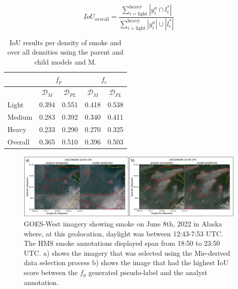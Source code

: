 \documentclass{article}
\begin{document}
\begin{equation} \label{overall_iou}
    IoU_{\text{overall}} = \frac{\sum\limits_{i=\text{light}}^{\text{heavy}}|y^a_{i}\cap l^*_{i}|  }{\sum\limits_{i=\text{light}}^{\text{heavy}}|y^a_{i}|\cup|l^*_{i}|}
\end{equation}

\begin{table} 
    \caption{IoU results per density of smoke and over all densities using the parent and child models and M.}\label{iou_results}
    \centering
    \begin{tabular}{lcc|cc}
        \toprule
        \multicolumn{1}{c}{} & \multicolumn{2}{c}{\(f_p\)} & \multicolumn{2}{c}{\(f_c\)}\\
        \midrule
        \multicolumn{1}{c}{} & \(\mathcal{D}_M\) & \(\mathcal{D}_{PL}\) & \(\mathcal{D}_M\) & \(\mathcal{D}_{PL}\) \\
        \midrule
        Light  & 0.394 &  0.551 & 0.418 &  0.538 \\
        Medium & 0.283 &  0.392 & 0.340 &  0.411 \\
        Heavy  & 0.233 &  0.290 & 0.270 &  0.325 \\
        Overall & 0.365 &  0.510 & 0.396 &  0.503 \\
        \bottomrule
    \end{tabular}
\end{table}

\begin{figure}
    \centering
    \includegraphics[width=14cm]{figures/D_m_vs_D_pl.png}
    \caption{GOES-West imagery showing smoke on June 8th, 2022 in Alaska where, at this geolocation, daylight was between 12:43-7:53 UTC. The HMS smoke annotations displayed span from 18:50 to 23:50 UTC. a) shows the imagery that was selected using the Mie-derived data selection process b) shows the image that had the highest IoU score between the \(f_p\) generated pseudo-label and the analyst annotation.}\label{ml_vs_mei}
\end{figure}
\end{document}
